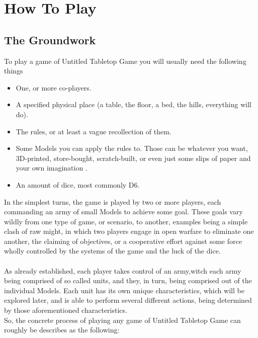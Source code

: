 \documentclass[a4paper,12pt]{report}
\begin{document}
\chapter{How To Play}

\section {The Groundwork}
To play a game of Untitled Tabletop Game you will usually need the following things

\begin{adjustwidth}{-2cm}{-2cm}
\begin{multicols}{3}
\begin{itemize}

	\item One, or more co-players.
	\item A specified physical place (a table, the floor, a bed, the hills, everything will do).
	\item The rules, or at least a vague recollection of them.
	\item Some Models you can apply the rules to. Those can be whatever you want, 3D-printed, store-bought, scratch-built, or even just some slips of paper and your own imagination .
	\item An amount of dice, most commonly D6.
	
\end{itemize}
\end{multicols}
\end{adjustwidth}


In the simplest turns, the game is played by two or more  players, each commanding an army of small Models to achieve some goal. These goals vary wildly from one type of game, or scenario, to another, examples being a simple clash of raw might, in which two players engage in open warfare to eliminate one another, the claiming of objectives, or a cooperative effort against some force wholly controlled by the systems of the game and the luck of the dice.\\
\\

As already established, each player takes control of an army,witch each army being comprised of so called units, and they, in turn, being comprised out of the individual Models. Each unit has its own unique characteristics, which will be explored later, and is able to perform several different actions,  being determined by those aforementioned characteristics.\\
\newpage
So, the concrete process of playing any game of Untitled Tabletop Game can roughly be describes as the following:\\
\end{document}

